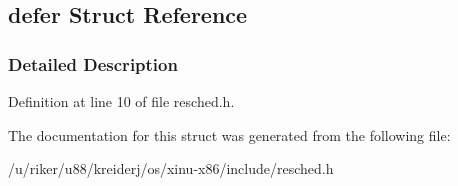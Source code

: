 \hypertarget{structdefer}{}\subsection{defer Struct Reference}
\label{structdefer}


\subsubsection{Detailed Description}


Definition at line 10 of file resched.\+h.



The documentation for this struct was generated from the following file\+:\begin{DoxyCompactItemize}
\item 
/u/riker/u88/kreiderj/os/xinu-\/x86/include/resched.\+h\end{DoxyCompactItemize}
